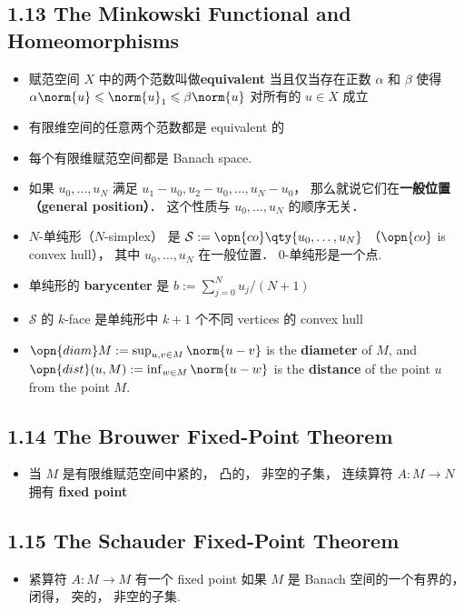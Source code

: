 \subsection{1.13 The Minkowski Functional and Homeomorphisms}
\begin{itemize}
\item 赋范空间 $X$ 中的两个范数叫做\textbf{equivalent} 当且仅当存在正数 $\alpha$ 和 $\beta$ 使得 $\alpha \norm{u} \leqslant \norm{u}_1 \leqslant \beta \norm{u}$ 对所有的 $u \in X$ 成立

\item 有限维空间的任意两个范数都是 equivalent 的

\item 每个有限维赋范空间都是 Banach space.

\item 如果 $u_0, \dots, u_N$  满足 $u_1 - u_0, u_2 - u_0,\dots, u_N - u_0$， 那么就说它们在\textbf{一般位置（general position）}． 这个性质与 $u_0, \dots, u_N$ 的顺序无关．

\item $N$-单纯形（$N$-simplex） 是 $\mathcal S := \opn{co}\qty{u_0, \dots, u_N}$ （$\opn{co}$ is convex hull）， 其中 $u_0, \dots, u_N$ 在一般位置． $0$-单纯形是一个点.

\item 单纯形的 \textbf{barycenter} 是 $b := \sum_{j=0}^N u_j / (N+1)$

\item $\mathcal S$ 的 $k$-face 是单纯形中 $k+1$ 个不同 vertices 的 convex hull

\item $\opn{diam} M := \sup_{u, v\in M} \norm{u - v}$ is the \textbf{diameter} of $M$, and $\opn{dist}(u, M) := \inf_{w \in M} \norm{u - w}$ is the \textbf{distance} of the point $u$ from the point $M$.
\end{itemize}

\subsection{1.14 The Brouwer Fixed-Point Theorem}

\begin{itemize}
\item 当 $M$ 是有限维赋范空间中紧的， 凸的， 非空的子集， 连续算符 $A: M \to N$ 拥有 \textbf{fixed point}
\end{itemize}

\subsection{1.15 The Schauder Fixed-Point Theorem}
\begin{itemize}
\item 紧算符 $A: M \to M$ 有一个 fixed point 如果 $M$ 是 Banach 空间的一个有界的， 闭得， 突的， 非空的子集.
\end{itemize}

